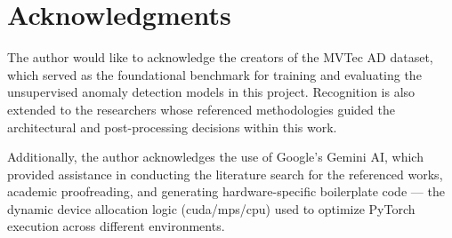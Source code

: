 \documentclass[10pt,twocolumn,a4paper]{article}
\begin{document}
\section*{Acknowledgments}
	
The author would like to acknowledge the creators of the MVTec AD dataset, which served as the foundational benchmark for training and evaluating the unsupervised anomaly detection models in this project. Recognition is also extended to the researchers whose referenced methodologies guided the architectural and post-processing decisions within this work. 


Additionally, the author acknowledges the use of Google’s Gemini AI, which provided assistance in conducting the literature search for the referenced works, academic proofreading, and generating hardware-specific boilerplate code — the dynamic device allocation logic (cuda/mps/cpu) used to optimize PyTorch execution across different environments.
	
\end{document}
